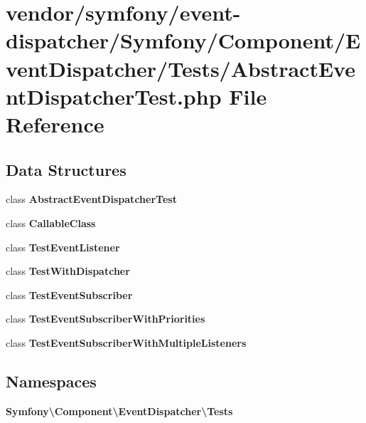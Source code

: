 \section{vendor/symfony/event-\/dispatcher/\+Symfony/\+Component/\+Event\+Dispatcher/\+Tests/\+Abstract\+Event\+Dispatcher\+Test.php File Reference}
\label{_abstract_event_dispatcher_test_8php}
\subsection*{Data Structures}
\begin{DoxyCompactItemize}
\item 
class {\bf Abstract\+Event\+Dispatcher\+Test}
\item 
class {\bf Callable\+Class}
\item 
class {\bf Test\+Event\+Listener}
\item 
class {\bf Test\+With\+Dispatcher}
\item 
class {\bf Test\+Event\+Subscriber}
\item 
class {\bf Test\+Event\+Subscriber\+With\+Priorities}
\item 
class {\bf Test\+Event\+Subscriber\+With\+Multiple\+Listeners}
\end{DoxyCompactItemize}
\subsection*{Namespaces}
\begin{DoxyCompactItemize}
\item 
 {\bf Symfony\textbackslash{}\+Component\textbackslash{}\+Event\+Dispatcher\textbackslash{}\+Tests}
\end{DoxyCompactItemize}
